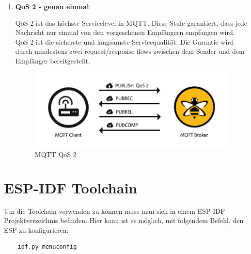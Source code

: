 \begin{enumerate}
    \item \textbf{QoS 2 - genau einmal}:
    
    QoS 2 ist das höchste Servicelevel in MQTT. Diese Stufe garantiert, dass jede Nachricht nur einmal von den vorgesehenen Empfängern empfangen wird. QoS 2 ist die sicherste und langsamste Servicequalität. Die Garantie wird durch mindestens zwei request/response flows zwischen dem Sender und dem Empfänger bereitgestellt. 

    \begin{figure}[H]
        \begin{center}
            \includegraphics[scale=0.8]{images/QoS-2.png}
            \caption{MQTT QoS 2 \cite{hivemq}}
        \end{center}
    \end{figure}
\end{enumerate}

\section{ESP-IDF Toolchain}\label{sec:esp-idf-toolchain}
Um die Toolchain verwenden zu können muss man sich in einem ESP-IDF Projektverzeichnis befinden. Hier kann ist es möglich, mit folgendem Befehl, den ESP zu konfigurieren:

\begin{verbatim}
    idf.py menuconfig
\end{verbatim}

